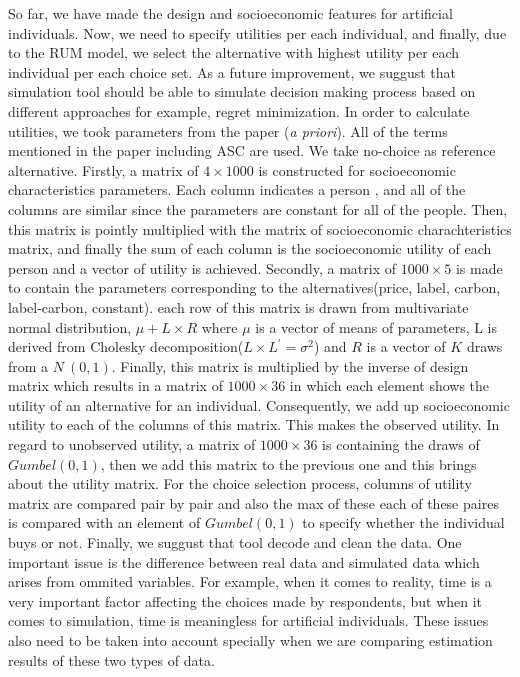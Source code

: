 \documentclass[11pt,]{article}
\begin{document}
So far, we have made the design and socioeconomic features for
artificial individuals. Now, we need to specify utilities per each
individual, and finally, due to the RUM model, we select the alternative
with highest utility per each individual per each choice set. As a
future improvement, we suggust that simulation tool should be able to
simulate decision making process based on different approaches for
example, regret minimization. In order to calculate utilities, we took
parameters from the paper (\emph{a priori}). All of the terms mentioned
in the paper including ASC are used. We take no-choice as reference
alternative. Firstly, a matrix of \(4\times 1000\) is constructed for
socioeconomic characteristics parameters. Each column indicates a person
, and all of the columns are similar since the parameters are constant
for all of the people. Then, this matrix is pointly multiplied with the
matrix of socioeconomic charachteristics matrix, and finally the sum of
each column is the socioeconomic utility of each person and a vector of
utility is achieved. Secondly, a matrix of \(1000\times 5\) is made to
contain the parameters corresponding to the alternatives(price, label,
carbon, label-carbon, constant). each row of this matrix is drawn from
multivariate normal distribution, \(\mu + L\times R\) where \(\mu\) is a
vector of means of parameters, L is derived from Cholesky
decomposition(\(L\times L^{\prime} = \sigma^2\)) and \(R\) is a vector
of \(K\) draws from a \(N~(0,1)\). Finally, this matrix is multiplied by
the inverse of design matrix which results in a matrix of
\(1000\times 36\) in which each element shows the utility of an
alternative for an individual. Consequently, we add up socioeconomic
utility to each of the columns of this matrix. This makes the observed
utility. In regard to unobserved utility, a matrix of \(1000\times 36\)
is containing the draws of \(Gumbel(0,1)\), then we add this matrix to
the previous one and this brings about the utility matrix. For the
choice selection process, columns of utility matrix are compared pair by
pair and also the max of these each of these paires is compared with an
element of \(Gumbel(0,1)\) to specify whether the individual buys or
not. Finally, we suggust that tool decode and clean the data. One
important issue is the difference between real data and simulated data
which arises from ommited variables. For example, when it comes to
reality, time is a very important factor affecting the choices made by
respondents, but when it comes to simulation, time is meaningless for
artificial individuals. These issues also need to be taken into account
specially when we are comparing estimation results of these two types of
data.
\end{document}
